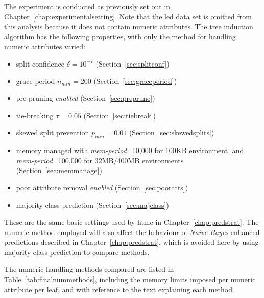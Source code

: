 The experiment is conducted as previously set out in Chapter~\ref{chap:experimentalsetting}. Note that the {\sc led} data set is omitted from this analysis because it does not contain numeric attributes. The tree induction algorithm has the following properties, with only the method for handling numeric attributes varied:

\begin{itemize}
\item split confidence $\delta = 10^{-7}$ (Section~\ref{sec:splitconf})
\item grace period $n_{min} = 200$ (Section~\ref{sec:graceperiod})
\item pre-pruning {\em enabled} (Section~\ref{sec:preprune})
\item tie-breaking $\tau = 0.05$ (Section~\ref{sec:tiebreak})
\item skewed split prevention $p_{min} = 0.01$ (Section~\ref{sec:skewedsplits})
\item memory managed with {\em mem-period}=10,000 for 100KB environment, and {\em mem-period}=100,000 for 32MB/400MB environments (Section~\ref{sec:memmanage})
\item poor attribute removal {\em enabled} (Section~\ref{sec:pooratts})
\item majority class prediction (Section~\ref{sec:majclass})
\end{itemize}

These are the same basic settings used by {\sc htmc} in Chapter~\ref{chap:predstrat}. The numeric method employed will also affect the behaviour of {\em Naive Bayes} enhanced predictions described in Chapter~\ref{chap:predstrat}, which is avoided here by using majority class prediction to compare methods.

The numeric handling methods compared are listed in Table~\ref{tab:finalnummethods}, including the memory limits imposed per numeric attribute per leaf, and with reference to the text explaining each method.


